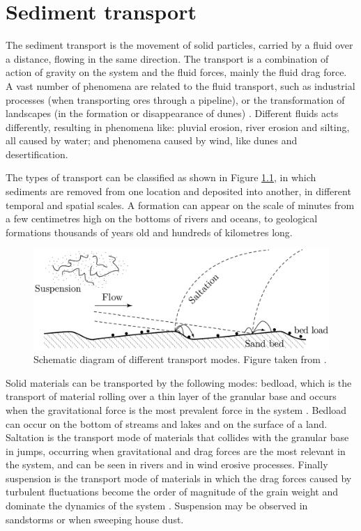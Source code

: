 \chapter{Sediment transport}
\label{chap:Transporte-Sedimentos}
    The sediment transport is the movement of solid particles, carried by a fluid over a distance, flowing in the same direction. The transport is a combination of action of gravity on the system and the fluid forces, mainly the fluid drag force. A vast number of phenomena are related to the fluid transport, such as industrial processes (when transporting ores through a pipeline), or the transformation of landscapes (in the formation or disappearance of dunes) \cite{Granular_Media_Between_Fluid_and_Solid}. Different fluids acts differently, resulting in phenomena like: pluvial erosion, river erosion and silting, all caused by water; and phenomena caused by wind, like dunes and desertification. 

    The types of transport can be classified as shown in Figure \ref{fig:transport_mode}, in which sediments are removed from one location and deposited into another, in different temporal and spatial scales. A formation can appear on the scale of minutes from a few centimetres high on the bottoms of rivers and oceans, to geological formations thousands of years old and hundreds of kilometres long.

\begin{figure}[H]
    \centering
    \includegraphics[width = 0.75 \textwidth]{04-figuras/TransportModes.png}
    \caption[Transport modes.]{Schematic diagram of different transport modes. Figure taken from \cite{Granular_Media_Between_Fluid_and_Solid}.}
    \label{fig:transport_mode}
\end{figure}

    Solid materials can be transported by the following modes: bedload, which is the transport of material rolling over a thin layer of the granular base and occurs when the gravitational force is the most prevalent force in the system \cite{Bedforms_in_a_turbulent_stream}. Bedload can occur on the bottom of streams and lakes and on the surface of a land. Saltation is the transport mode of materials that collides with the granular base in jumps, occurring when gravitational and drag forces are the most relevant in the system, and can be seen in rivers and in wind erosive processes. Finally suspension is the transport mode of materials in which the drag forces caused by turbulent fluctuations become the order of magnitude of the grain weight and dominate the dynamics of the system \cite{FVSCS}. Suspension may be observed in sandstorms or when sweeping house dust. 

